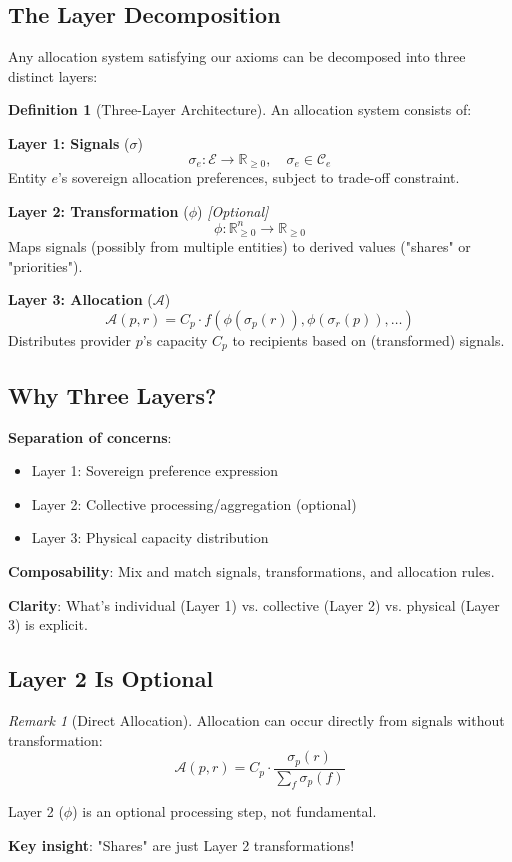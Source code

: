 \documentclass[11pt,a4paper]{article}
\theoremstyle{definition}
\newtheorem{definition}[theorem]{Definition}
\theoremstyle{remark}
\newtheorem{remark}[theorem]{Remark}
\newcommand{\E}{\mathcal{E}}
\newcommand{\A}{\mathcal{A}}
\newcommand{\C}{\mathcal{C}}
\begin{document}
\subsection{The Layer Decomposition}

Any allocation system satisfying our axioms can be decomposed into three distinct layers:

\begin{definition}[Three-Layer Architecture]
An allocation system consists of:

\textbf{Layer 1: Signals} ($\sigma$)
\[ \sigma_e: \E \to \mathbb{R}_{\ge 0}, \quad \sigma_e \in \C_e \]
Entity $e$'s sovereign allocation preferences, subject to trade-off constraint.

\textbf{Layer 2: Transformation} ($\phi$) \textit{[Optional]}
\[ \phi: \mathbb{R}_{\ge 0}^n \to \mathbb{R}_{\ge 0} \]
Maps signals (possibly from multiple entities) to derived values ("shares" or "priorities").

\textbf{Layer 3: Allocation} ($\A$)
\[ \A(p,r) = C_p \cdot f(\phi(\sigma_p(r)), \phi(\sigma_r(p)), \ldots) \]
Distributes provider $p$'s capacity $C_p$ to recipients based on (transformed) signals.
\end{definition}

\subsection{Why Three Layers?}

\textbf{Separation of concerns}:
\begin{itemize}
\item Layer 1: Sovereign preference expression
\item Layer 2: Collective processing/aggregation (optional)
\item Layer 3: Physical capacity distribution
\end{itemize}

\textbf{Composability}: Mix and match signals, transformations, and allocation rules.

\textbf{Clarity}: What's individual (Layer 1) vs. collective (Layer 2) vs. physical (Layer 3) is explicit.

\subsection{Layer 2 Is Optional}

\begin{remark}[Direct Allocation]
Allocation can occur directly from signals without transformation:
\[ \A(p,r) = C_p \cdot \frac{\sigma_p(r)}{\sum_f \sigma_p(f)} \]

Layer 2 ($\phi$) is an optional processing step, not fundamental.

\textbf{Key insight}: "Shares" are just Layer 2 transformations!
\end{remark}
\end{document}
